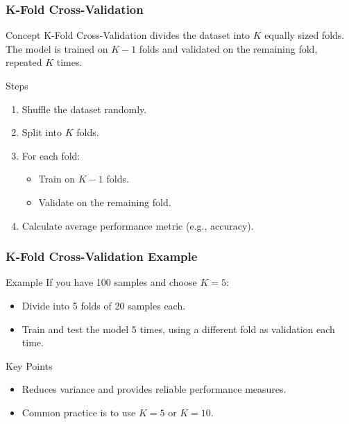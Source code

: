 \documentclass[aspectratio=169]{beamer}
\begin{document}
\begin{frame}
    \frametitle{K-Fold Cross-Validation}
    \begin{block}{Concept}
        K-Fold Cross-Validation divides the dataset into \(K\) equally sized folds. The model is trained on \(K-1\) folds and validated on the remaining fold, repeated \(K\) times.
    \end{block}
    
    \begin{block}{Steps}
        \begin{enumerate}
            \item Shuffle the dataset randomly.
            \item Split into \(K\) folds.
            \item For each fold:
            \begin{itemize}
                \item Train on \(K-1\) folds.
                \item Validate on the remaining fold.
            \end{itemize}
            \item Calculate average performance metric (e.g., accuracy).
        \end{enumerate}
    \end{block}
\end{frame}

\begin{frame}
    \frametitle{K-Fold Cross-Validation Example}
    \begin{block}{Example}
        If you have 100 samples and choose \(K=5\):
        \begin{itemize}
            \item Divide into 5 folds of 20 samples each.
            \item Train and test the model 5 times, using a different fold as validation each time.
        \end{itemize}
    \end{block}
    
    \begin{block}{Key Points}
        \begin{itemize}
            \item Reduces variance and provides reliable performance measures.
            \item Common practice is to use \(K=5\) or \(K=10\).
        \end{itemize}
    \end{block}
\end{frame}
\end{document}
